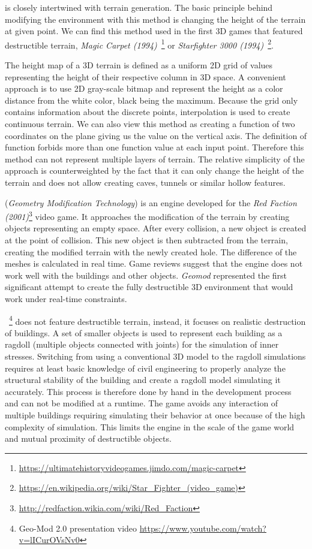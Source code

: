  is closely intertwined with terrain generation. The basic principle behind modifying the environment with this method is changing the height of the terrain at given point. We can find this method used in the first 3D games that featured destructible terrain, \eg \emph{Magic Carpet (1994)}~\footnote{\url{https://ultimatehistoryvideogames.jimdo.com/magic-carpet}} or \emph{Starfighter 3000 (1994)}~\footnote{\url{https://en.wikipedia.org/wiki/Star\_Fighter\_(video\_game)}}.

The height map of a 3D terrain is defined as a uniform 2D grid of values representing the height of their respective column in 3D space. A convenient approach is to use 2D gray-scale bitmap and represent the height as a color distance from the white color, black being the maximum. Because the grid only contains information about the discrete points, interpolation is used to create continuous terrain. We can also view this method as creating a function of two coordinates on the plane giving us the value on the vertical axis. The definition of function forbids more than one function value at each input point. Therefore this method can not represent multiple layers of terrain. The relative simplicity of the approach is counterweighted by the fact that it can only change the height of the terrain and does not allow creating caves, tunnels or similar hollow features.

 (\emph{Geometry Modification Technology}\cite{geomod}) is an engine developed for the \emph{Red Faction (2001)}\footnote{\url{http://redfaction.wikia.com/wiki/Red\_Faction}} video game. It approaches the modification of the terrain by creating objects representing an empty space. After every collision, a new object is created at the point of collision. This new object is then subtracted from the terrain, creating the modified terrain with the newly created hole. The difference of the meshes is calculated in real time. Game reviews suggest that the engine does not work well with the buildings and other objects. \emph{Geomod} represented the first significant attempt to create the fully destructible 3D environment that would work under real-time constraints.

~\cite{geomod}\footnote{Geo-Mod 2.0 presentation video \url{https://www.youtube.com/watch?v=lICurOVsNv0}} does not feature destructible terrain, instead, it focuses on realistic destruction of buildings. A set of smaller objects is used to represent each building as a ragdoll (multiple objects connected with joints) for the simulation of inner stresses. Switching from using a conventional 3D model to the ragdoll simulations requires at least basic knowledge of civil engineering to properly analyze the structural stability of the building and create a ragdoll model simulating it accurately. This process is therefore done by hand in the development process and can not be modified at a runtime.  The game avoids any interaction of multiple buildings requiring simulating their behavior at once because of the high complexity of simulation. This limits the engine in the scale of the game world and mutual proximity of destructible objects.


